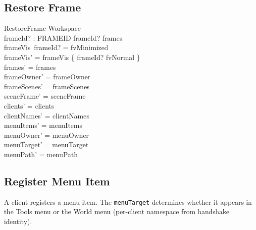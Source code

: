 \documentclass[a4paper,10pt,fleqn]{article}
\begin{document}
\subsection{Restore Frame}

\begin{schema}{RestoreFrame}
  \Delta Workspace \\
  frameId? : FRAMEID
  \where
  frameId? \in frames \\
  frameVis~frameId? = fvMinimized \\
  frameVis' = frameVis \oplus \{ frameId? \mapsto fvNormal \} \\
  frames' = frames \\
  frameOwner' = frameOwner \\
  frameScenes' = frameScenes \\
  sceneFrame' = sceneFrame \\
  clients' = clients \\
  clientNames' = clientNames \\
  menuItems' = menuItems \\
  menuOwner' = menuOwner \\
  menuTarget' = menuTarget \\
  menuPath' = menuPath
\end{schema}

\subsection{Register Menu Item}

A client registers a menu item.  The \texttt{menuTarget} determines
whether it appears in the Tools menu or the World menu
(per-client namespace from handshake identity).
\end{document}
